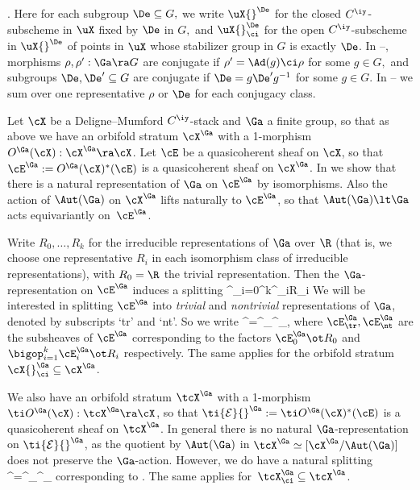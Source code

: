 \documentclass{article}
\begin{document}
\begin{thm}
{\!\!\!\!\!\!\!\!\!\!\!\!\!\!\!\!\!\!\!\!\!\!\!}
\bigl[\,\uX^\De_\ci\big/\bigl(\{g\in G:\De=g\De
g^{-1}\}/\De\bigr)\bigr].
\label{ds8eq9}
\ea
Here for each subgroup\/ $\De\subseteq G,$ we write\/ $\uX{}^\De$
for the closed\/ $C^\iy$-subscheme in\/ $\uX$ fixed by $\De$ in\/
$G,$ and\/ $\uX{}^\De_\ci$ for the open $C^\iy$-subscheme in
$\uX{}^\De$ of points in $\uX$ whose stabilizer group in $G$ is
exactly\/ $\De$. In {\rm{}--,} morphisms
$\rho,\rho':\Ga\ra G$ are conjugate if\/ $\rho'=\Ad(g)\ci\rho$ for
some $g\in G,$ and subgroups $\De,\De'\subseteq G$ are conjugate
if\/ $\De=g\De'g^{-1}$ for some $g\in G$. In
-- we sum over one representative $\rho$ or
$\De$ for each conjugacy class.
\label{ds8thm4}
\end{thm}

Let $\cX$ be a Deligne--Mumford $C^\iy$-stack and $\Ga$ a finite
group, so that as above we have an orbifold stratum $\cX^\Ga$ with a
1-morphism $O^\Ga(\cX):\cX^\Ga\ra\cX$. Let $\cE$ be a quasicoherent
sheaf on $\cX$, so that
$\cE^\Ga:=O^\Ga(\cX)^*(\cE)$ is a quasicoherent sheaf on $\cX^\Ga$.
In \cite[\S 11.4]{Joyc4} we show that there is a natural
representation of $\Ga$ on $\cE^\Ga$ by isomorphisms. Also the
action of $\Aut(\Ga)$ on $\cX^\Ga$ lifts naturally to $\cE^\Ga$, so
that $\Aut(\Ga)\lt\Ga$ acts equivariantly on~$\cE^\Ga$.

Write $R_0,\ldots,R_k$ for the irreducible representations of $\Ga$
over $\R$ (that is, we choose one representative $R_i$ in each
isomorphism class of irreducible representations), with $R_0=\R$ the
trivial representation. Then the $\Ga$-representation on $\cE^\Ga$
induces a splitting
\e
\cE^\Ga\cong\ts\bigop_{i=0}^k\cE^\Ga_i\ot R_i\quad{}
\label{ds8eq10}
\e
We will be interested in splitting $\cE^\Ga$ into {\it trivial\/}
and {\it nontrivial\/} representations of $\Ga$, denoted by
subscripts `tr' and `nt'. So we write
\e
\cE^\Ga=\cE^\Ga_\tr\op\cE^\Ga_\nt,
\label{ds8eq11}
\e
where $\cE^\Ga_\tr,\cE^\Ga_\nt$ are the subsheaves of $\cE^\Ga$
corresponding to the factors $\cE^\Ga_0\ot R_0$ and
$\bigop_{i=1}^k\cE^\Ga_i\ot R_i$ respectively. The same applies for
the orbifold stratum~$\cX{}^\Ga_\ci\subseteq\cX^\Ga$.

We also have an orbifold stratum $\tcX^\Ga$ with a 1-morphism $\ti
O{}^\Ga(\cX):\tcX^\Ga\ra\cX$, so that $\ti{\cal E}{}^\Ga:=\ti
O^\Ga(\cX)^*(\cE)$ is a quasicoherent sheaf on $\tcX^\Ga$. In
general there is no natural $\Ga$-representation on $\ti{\cal
E}{}^\Ga$, as the quotient by $\Aut(\Ga)$ in
$\tcX^\Ga\simeq[\cX^\Ga/ \Aut(\Ga)]$ does not preserve the
$\Ga$-action. However, we do have a natural splitting
\e
{}^\Ga=^\Ga_\tr\op{}^\Ga_\nt
\label{ds8eq12}
\e
corresponding to . The same applies
for~$\tcX^\Ga_\ci\subseteq\tcX^\Ga$.
\end{document}
